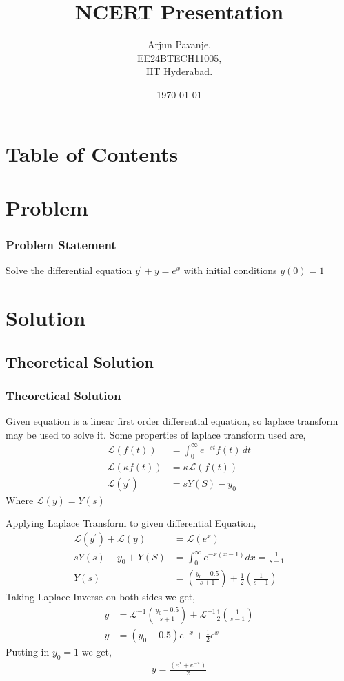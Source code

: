 \documentclass{beamer}
\title{NCERT Presentation}
\author{Arjun Pavanje,\\ EE24BTECH11005,\\IIT Hyderabad.\\}
\date{\today}
\providecommand{\brak}[1]{\ensuremath{\left(#1\right)}}
\theoremstyle{remark}
\numberwithin{equation}{section}
\begin{document}
		\begin{frame}
			\titlepage
		\end{frame}

		\section*{Table of Contents}
		\begin{frame}
			\tableofcontents
		\end{frame}
		\section{Problem}
		\begin{frame}
			\frametitle{Problem Statement}
Solve the differential equation $y^{\prime}+y=e^x$ with initial conditions $y\brak{0}=1$      		\end{frame}
		\section{Solution}
		\subsection{Theoretical Solution}
		\begin{frame}
      \frametitle{Theoretical Solution}
Given equation is a linear first order differential equation, so laplace transform may be used to solve it. Some properties of laplace transform used are,
\begin{align}
  \mathcal{L}\brak{f\brak{t}} &= \int_0^{\infty} e^{-st} f\brak{t} \, dt\\
 \mathcal{L}\brak{\kappa f\brak{t}} &= \kappa \mathcal{L}\brak{f\brak{t}}\\
  \mathcal{L}\brak{y^{\prime}} &= sY\brak{S} - y_0
\end{align}
Where $\mathcal{L}\brak{y} = Y\brak{s}$
    \end{frame}
    \begin{frame}
Applying Laplace Transform to given differential Equation,
      {\small
\begin{align}
  \mathcal{L}\brak{y^{\prime}} + \mathcal{L}\brak{y} &= \mathcal{L}\brak{e^{x}}\\
  sY\brak{s} - y_0 + Y\brak{S} &= \int_0^{\infty} e^{-x\brak{x - 1} } dx = \frac{1}{s-1}\\
  Y\brak{s} &= \brak{\frac{y_0 - 0.5}{s+1}} + \frac{1}{2}\brak{\frac{1}{s-1}}
 \end{align}    
      }
Taking Laplace Inverse on both sides we get,
      {\small
 \begin{align}
   y &= \mathcal{L}^{-1}\brak{\frac{y_0 - 0.5}{s+1}} + \mathcal{L}^{-1}\frac{1}{2}\brak{\frac{1}{s-1}}\\
   y &= \brak{y_0 - 0.5}e^{-x} + \frac{1}{2} e^{x}
 \end{align}
    }
 Putting in $y_0 = 1$ we get,
 \begin{align}
   y = \frac{\brak{e^{x} + e^{-x}}}{2}
 \end{align}    \end{frame}
\end{document}

